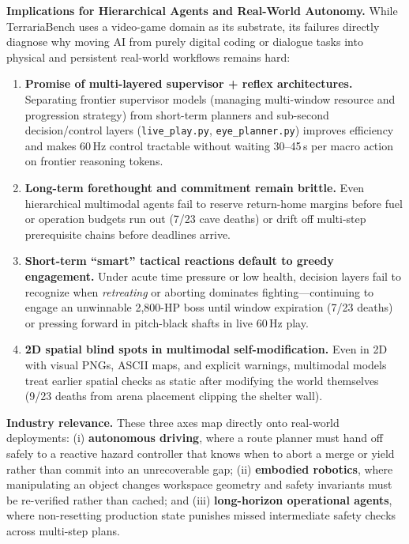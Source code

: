 \documentclass[10pt,letterpaper]{article}
\begin{document}
\textbf{Implications for Hierarchical Agents and Real-World Autonomy.} While TerrariaBench uses a video-game domain as its substrate, its failures directly diagnose why moving AI from purely digital coding or dialogue tasks into physical and persistent real-world workflows remains hard:
\begin{enumerate}[leftmargin=18pt,itemsep=2pt]
  \item \textbf{Promise of multi-layered supervisor + reflex architectures.} Separating frontier supervisor models (managing multi-window resource and progression strategy) from short-term planners and sub-second decision/control layers (\texttt{live\_play.py}, \texttt{eye\_planner.py}) improves efficiency and makes 60\,Hz control tractable without waiting 30--45\,s per macro action on frontier reasoning tokens.
  \item \textbf{Long-term forethought and commitment remain brittle.} Even hierarchical multimodal agents fail to reserve return-home margins before fuel or operation budgets run out (7/23 cave deaths) or drift off multi-step prerequisite chains before deadlines arrive.
  \item \textbf{Short-term ``smart'' tactical reactions default to greedy engagement.} Under acute time pressure or low health, decision layers fail to recognize when \emph{retreating} or aborting dominates fighting---continuing to engage an unwinnable 2,800-HP boss until window expiration (7/23 deaths) or pressing forward in pitch-black shafts in live 60\,Hz play.
  \item \textbf{2D spatial blind spots in multimodal self-modification.} Even in 2D with visual PNGs, ASCII maps, and explicit warnings, multimodal models treat earlier spatial checks as static after modifying the world themselves (9/23 deaths from arena placement clipping the shelter wall).
\end{enumerate}
\noindent\textbf{Industry relevance.} These three axes map directly onto real-world deployments: (i) \textbf{autonomous driving}, where a route planner must hand off safely to a reactive hazard controller that knows when to abort a merge or yield rather than commit into an unrecoverable gap; (ii) \textbf{embodied robotics}, where manipulating an object changes workspace geometry and safety invariants must be re-verified rather than cached; and (iii) \textbf{long-horizon operational agents}, where non-resetting production state punishes missed intermediate safety checks across multi-step plans.
\end{document}
